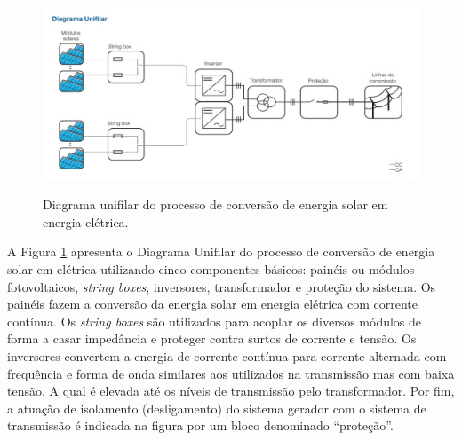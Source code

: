 \begin{figure}[H]
  \centering
  \caption{Diagrama unifilar do processo de conversão de energia solar em energia elétrica.}
  \includegraphics[width=\textwidth]{images/Diagrama-Unifilar.jpg}
  \label{fig:diagrama_unifilar}
\end{figure}

A Figura \ref{fig:diagrama_unifilar} apresenta o Diagrama Unifilar do processo de conversão de energia solar em elétrica utilizando cinco componentes básicos: painéis ou módulos fotovoltaicos, \textit{string boxes}, inversores, transformador e proteção do sistema. Os painéis fazem a conversão da energia solar em energia elétrica com corrente contínua. Os \textit{string boxes} são utilizados para acoplar os diversos módulos de forma a casar impedância e proteger contra surtos de corrente e tensão. Os inversores convertem a energia de corrente contínua para corrente alternada com frequência e forma de onda similares aos utilizados na transmissão mas com baixa tensão. A qual é elevada até os níveis de transmissão pelo transformador. Por fim, a atuação de isolamento (desligamento) do sistema gerador com o sistema de transmissão é indicada na figura por um bloco denominado ``proteção''.